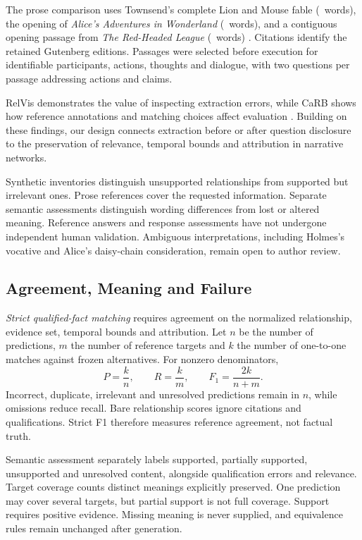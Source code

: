 \documentclass[a4paper,twoside]{article}
\begin{document}
The prose comparison uses Townsend's complete Lion and Mouse fable (\FableWords\ words), the opening of \emph{Alice's Adventures in Wonderland} (\AliceWords\ words), and a contiguous opening passage from \emph{The Red-Headed League} (\HolmesWords\ words) \cite{aesop,carroll,doyle}. Citations identify the retained Gutenberg editions. Passages were selected before execution for identifiable participants, actions, thoughts and dialogue, with two questions per passage addressing actions and claims.

RelVis demonstrates the value of inspecting extraction errors, while CaRB shows how reference annotations and matching choices affect evaluation \cite{schneider2017,bhardwaj2019}. Building on these findings, our design connects extraction before or after question disclosure to the preservation of relevance, temporal bounds and attribution in narrative networks.

Synthetic inventories distinguish unsupported relationships from supported but irrelevant ones. Prose references cover the requested information. Separate semantic assessments distinguish wording differences from lost or altered meaning. Reference answers and response assessments have not undergone independent human validation. Ambiguous interpretations, including Holmes's vocative and Alice's daisy-chain consideration, remain open to author review.




\subsection{Agreement, Meaning and Failure}
\noindent \emph{Strict qualified-fact matching} requires agreement on the normalized relationship, evidence set, temporal bounds and attribution. Let $n$ be the number of predictions, $m$ the number of reference targets and $k$ the number of one-to-one matches against frozen alternatives. For nonzero denominators,
\begin{equation}
\label{eq:strict-scores}
P=\frac{k}{n}, \qquad
R=\frac{k}{m}, \qquad
F_1=\frac{2k}{n+m}.
\end{equation}
Incorrect, duplicate, irrelevant and unresolved predictions remain in $n$, while omissions reduce recall. Bare relationship scores ignore citations and qualifications. Strict F1 therefore measures reference agreement, not factual truth.

Semantic assessment separately labels supported, partially supported, unsupported and unresolved content, alongside qualification errors and relevance. Target coverage counts distinct meanings explicitly preserved. One prediction may cover several targets, but partial support is not full coverage. Support requires positive evidence. Missing meaning is never supplied, and equivalence rules remain unchanged after generation.
\end{document}

